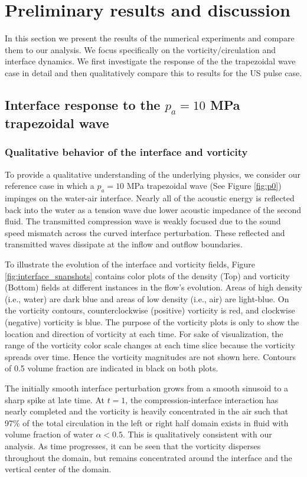 \section{Preliminary results and discussion}%
\label{sec:usbe_lung_results}%
In this section we present the results of the numerical experiments
and compare them to our analysis. We focus specifically on the
vorticity/circulation and interface dynamics. We first investigate the
response of the the trapezoidal wave case in detail and then
qualitatively compare this to results for the \ac{US} pulse case.
%
%
\subsection{Interface response to the $p_a=10$ MPa trapezoidal wave}
\label{subsec:Interface response to }
\subsubsection{Qualitative behavior of the interface and vorticity}
\label{subsubsec:Qualitative}
To provide a qualitative understanding of the underlying physics, we
consider our reference case in which a $p_a=10$ MPa trapezoidal wave
(See Figure \ref{fig:p0}) impinges on the water-air interface. Nearly
all of the acoustic energy is reflected back into the
water as a tension wave due lower acoustic impedance of the second
fluid. The transmitted compression wave is weakly focused due to the sound
speed mismatch across the curved interface perturbation. These
reflected and transmitted waves dissipate at the inflow and outflow
boundaries.

To illustrate the evolution of the interface and vorticity fields,
Figure \ref{fig:interface_snapshots} contains color plots of the
density (Top) and vorticity (Bottom) fields at different instances in
the flow's evolution. Areas of high density (i.e., water) are dark
blue and areas of low density (i.e., air) are light-blue. On the
vorticity contours, counterclockwise (positive) vorticity is red, and
clockwise (negative) vorticity is blue. The purpose of the vorticity
plots is only to show the location and direction of vorticity at each
time. For sake of visualization, the range of the vorticity color
scale changes at each time slice because the vorticity spreads over
time. Hence the vorticity magnitudes are not shown here. Contours of
0.5 volume fraction are indicated in black on both plots. 

The initially smooth interface perturbation grows from a smooth
sinusoid to a sharp spike at late time. At $t=1$, the
compression-interface interaction has nearly completed and the
vorticity is heavily concentrated in the air such that 97\% of the
total circulation in the left or right half domain exists in fluid
with volume fraction of water $\alpha<0.5$. This is qualitatively
consistent with our analysis. As time progresses, it can be seen that
the vorticity disperses throughout the domain, but remains
concentrated around the interface and the vertical center of the
domain.

